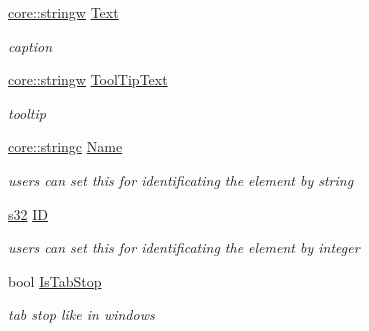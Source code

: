 \begin{DoxyCompactItemize}
\mbox{\label{classirr_1_1gui_1_1IGUIElement_af37f64cdacde0959e4993d01f555eba8}} 
\hyperlink{namespaceirr_1_1core_a5aedb62cb47cf01d1c548ab5e6344d2d}{core\+::stringw} \hyperlink{classirr_1_1gui_1_1IGUIElement_af37f64cdacde0959e4993d01f555eba8}{Text}
\begin{DoxyCompactList}\small\item\em caption \end{DoxyCompactList}\item 
\mbox{\label{classirr_1_1gui_1_1IGUIElement_a422166b880f7829ec4e7b31322df9061}} 
\hyperlink{namespaceirr_1_1core_a5aedb62cb47cf01d1c548ab5e6344d2d}{core\+::stringw} \hyperlink{classirr_1_1gui_1_1IGUIElement_a422166b880f7829ec4e7b31322df9061}{Tool\+Tip\+Text}
\begin{DoxyCompactList}\small\item\em tooltip \end{DoxyCompactList}\item 
\mbox{\label{classirr_1_1gui_1_1IGUIElement_acdc67728b14f264b38d194853c5b5179}} 
\hyperlink{namespaceirr_1_1core_ab26a0e0359206b5a694f35c37c829d7f}{core\+::stringc} \hyperlink{classirr_1_1gui_1_1IGUIElement_acdc67728b14f264b38d194853c5b5179}{Name}
\begin{DoxyCompactList}\small\item\em users can set this for identificating the element by string \end{DoxyCompactList}\item 
\mbox{\label{classirr_1_1gui_1_1IGUIElement_a73a25c6d25bd673d92210fc2d60d916e}} 
\hyperlink{namespaceirr_ac66849b7a6ed16e30ebede579f9b47c6}{s32} \hyperlink{classirr_1_1gui_1_1IGUIElement_a73a25c6d25bd673d92210fc2d60d916e}{ID}
\begin{DoxyCompactList}\small\item\em users can set this for identificating the element by integer \end{DoxyCompactList}\item 
\mbox{\label{classirr_1_1gui_1_1IGUIElement_af98dfbfc8776221b3a70ceea43fc4f9a}} 
bool \hyperlink{classirr_1_1gui_1_1IGUIElement_af98dfbfc8776221b3a70ceea43fc4f9a}{Is\+Tab\+Stop}
\begin{DoxyCompactList}\small\item\em tab stop like in windows \end{DoxyCompactList}\item 

\end{DoxyCompactItemize}

